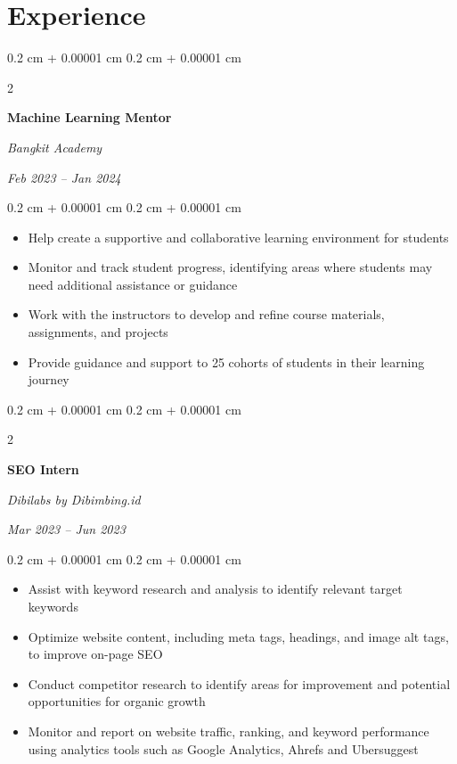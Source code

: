 \documentclass[10pt, letterpaper]{article}
\newenvironment{highlights}{
    \begin{itemize}[
        topsep=0.10 cm,
        parsep=0.10 cm,
        partopsep=0pt,
        itemsep=0pt,
        leftmargin=0.4 cm + 10pt
    ]
}{
    \end{itemize}
} %
\newenvironment{onecolentry}{
    \begin{adjustwidth}{
        0.2 cm + 0.00001 cm
    }{
        0.2 cm + 0.00001 cm
    }
}{
    \end{adjustwidth}
} %
\newenvironment{twocolentry}[2][]{
    \onecolentry
    \def\secondColumn{#2}
    \setcolumnwidth{\fill, 4.5 cm}
    \begin{paracol}{2}
}{
    \switchcolumn \raggedleft \secondColumn
    \end{paracol}
    \endonecolentry
} %
\begin{document}
    
    \section{Experience}



        
        \begin{twocolentry}{
        \textit{Feb 2023 – Jan 2024}}
            \textbf{Machine Learning Mentor}

            \textit{Bangkit Academy}
        \end{twocolentry}

        \vspace{0.10 cm}
        \begin{onecolentry}
            \begin{highlights}
                \item Help create a supportive and collaborative learning environment for students
                \item Monitor and track student progress, identifying areas where students may need additional assistance or guidance
                \item Work with the instructors to develop and refine course materials, assignments, and projects
                \item Provide guidance and support to 25 cohorts of students in their learning journey
            \end{highlights}
        \end{onecolentry}


        \vspace{0.2 cm}

        \begin{twocolentry}{
        \textit{Mar 2023 – Jun 2023}}
            \textbf{SEO Intern}

            \textit{Dibilabs by Dibimbing.id}
        \end{twocolentry}

        \vspace{0.10 cm}
        \begin{onecolentry}
            \begin{highlights}
                \item Assist with keyword research and analysis to identify relevant target keywords
                \item Optimize website content, including meta tags, headings, and image alt tags, to improve on-page SEO
                \item Conduct competitor research to identify areas for improvement and potential opportunities for organic growth
                \item Monitor and report on website traffic, ranking, and keyword performance using analytics tools such as Google Analytics, Ahrefs and Ubersuggest
            \end{highlights}
        \end{onecolentry}
\end{document}
